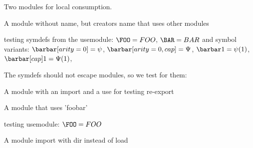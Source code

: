 \documentclass[minimal]{omdoc}
\begin{document}
Two modules for local consumption.
 

A module without name, but creators name that uses other modules
\begin{module}[creators=miko]
  testing symdefs from the usemodule: $\FOO=FOO$, $\BAR=BAR$
  and symbol variants: $\barbar[arity=0]=\psi$, $\barbar[arity=0,cap]=\Psi$, $\barbar1=\psi(1)$, $\barbar[cap]1=\Psi(1)$, 
\end{module}

The symdefs should not escape modules, so we test for them:
\ifx\FOO\undefined\else{}\fi

A module with an import and a use for testing re-export
\begin{module}[name=foobar]
\end{module}

A module  that uses 'foobar'
\begin{module}
  testing usemodule: $\FOO=FOO$
  \ifx\BAR\undefined\else{}\fi
\end{module}

A module import with dir instead of load
\begin{module}[name=foobarbar]
\end{module}
\end{document}
